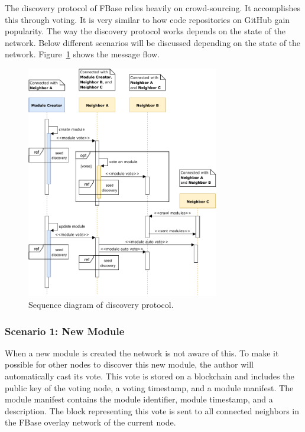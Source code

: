 The discovery protocol of FBase relies heavily on crowd-sourcing. It accomplishes this through voting. It is very similar to how code repositories on GitHub gain popularity. The way the discovery protocol works depends on the state of the network. Below different scenarios will be discussed depending on the state of the network. Figure~\ref{fig:discovery-protocol} shows the message flow.

\begin{figure}[h]
	\centering
	\includegraphics[width=0.75\textwidth]{images/design-discovery-protocol-main.pdf}
	\caption{\label{fig:discovery-protocol} Sequence diagram of discovery protocol.}
\end{figure}

\subsubsection{\textbf{Scenario 1: New Module}}

When a new module is created the network is not aware of this. To make it possible for other nodes to discover this new module, the author will automatically cast its vote. This vote is stored on a blockchain and includes the public key of the voting node, a voting timestamp, and a module manifest. The module manifest contains the module identifier, module timestamp, and a description. The block representing this vote is sent to all connected neighbors in the FBase overlay network of the current node. 

